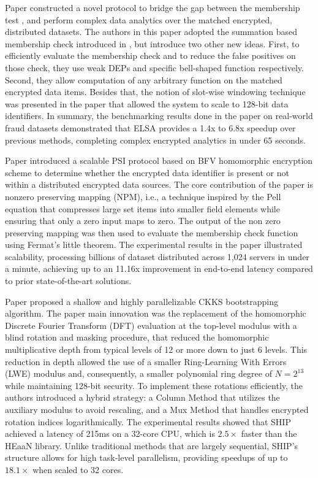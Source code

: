 \documentclass[12pt]{article}
\begin{document}
Paper \cite{koirala2025select} constructed a novel protocol to bridge the gap between the membership test \cite{koirala2025psmt}, and perform complex data analytics over the matched encrypted, distributed datasets. The authors in this paper adopted the summation based membership check introduced in \cite{koirala2025psmt}, but introduce two other new ideas. First, to efficiently evaluate the membership check and to reduce the false positives on those check, they use weak DEPs and specific bell-shaped function respectively. Second, they allow computation of any arbitrary function on the matched encrypted data items. Besides that, the notion of slot-wise windowing technique was presented in the paper that allowed the system to scale to 128-bit data identifiers. In summary, the benchmarking results done in the paper on real-world fraud datasets demonstrated that ELSA provides a 1.4x to 6.8x speedup over previous methods, completing complex encrypted analytics in under 65 seconds.

Paper \cite{paik2025scalable} introduced a scalable PSI protocol based on BFV homomorphic encryption scheme \cite{fan2012somewhat} to determine whether the encrypted data identifier is present or not within a distributed encrypted data sources. The core contribution of the paper is nonzero preserving mapping (NPM), i.e., a technique inspired by the Pell equation that compresses large set items into smaller field elements while ensuring that only a zero input maps to zero. The output of the non zero preserving mapping was then used to evaluate the membership check function using Fermat's little theorem. The experimental results in the paper illustrated scalability, processing billions of dataset distributed across 1,024 servers in under a minute, achieving up to an 11.16x improvement in end-to-end latency compared to prior state-of-the-art solutions.

Paper \cite{cheon2025ship} proposed a shallow and highly parallelizable CKKS \cite{cheon2017homomorphic} bootstrapping algorithm. The paper main innovation was the replacement of the homomorphic Discrete Fourier Transform (DFT) evaluation at the top-level modulus with a blind rotation and masking procedure, that reduced the homomorphic multiplicative depth from typical levels of 12 or more down to just 6 levels. This reduction in depth allowed the use of a smaller Ring-Learning With Errors (LWE) modulus and, consequently, a smaller polynomial ring degree of $N=2^{13}$ while maintaining 128-bit security. To implement these rotations efficiently, the authors introduced a hybrid strategy: a Column Method that utilizes the auxiliary modulus to avoid rescaling, and a Mux Method that handles encrypted rotation indices logarithmically. The experimental results showed that SHIP \cite{cheon2025ship} achieved a latency of 215ms on a 32-core CPU, which is $2.5\times$ faster than the HEaaN library. Unlike traditional methods that are largely sequential, SHIP's structure allows for high task-level parallelism, providing speedups of up to $18.1\times$ when scaled to 32 cores.
\end{document}
